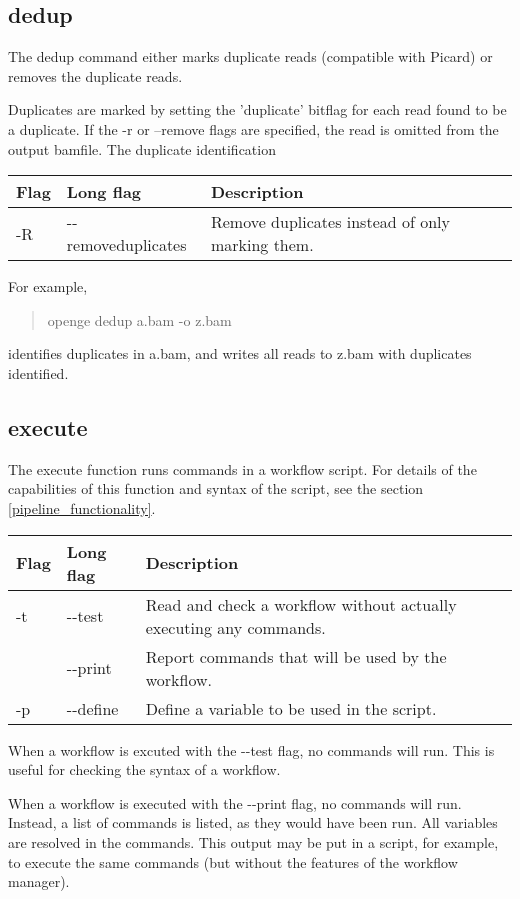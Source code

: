 \documentclass[11pt]{article}
\newcommand {\cmd}[1] {\begin{quote}#1\end{quote}}
\begin{document}
\subsection {dedup}
The dedup command either marks duplicate reads (compatible with Picard) or removes the duplicate reads. 

Duplicates are marked by setting the 'duplicate' bitflag for each read found to be a duplicate. If the -r or --remove flags are specified, the read is omitted from the output bamfile. The duplicate identification 

\begin{center}
\begin{tabular}{llp{3.5in}}
\hline
Flag&Long flag&Description\\ \hline
-R&{-}{-}removeduplicates&Remove duplicates instead of only marking them.\\
\end{tabular}
\end{center}

For example,
\cmd{openge dedup a.bam -o z.bam} 
identifies duplicates in a.bam, and writes all reads to z.bam with duplicates identified.

\subsection {execute}
\label{execute}

The execute function runs commands in a workflow script. For details of the capabilities of this function and syntax of the script, see the section \ref{pipeline_functionality}.

\begin{center}
\begin{tabular}{llp{4.5in}}
\hline
Flag&Long flag&Description\\ \hline
-t&{-}{-}test&Read and check a workflow without actually executing any commands.\\
&{-}{-}print&Report commands that will be used by the workflow.\\
-p&{-}{-}define&Define a variable to be used in the script.\\
\end{tabular}
\end{center}

When a workflow is excuted with the {-}{-}test flag, no commands will run. This is useful for checking the syntax of a workflow.

When a workflow is executed with the {-}{-}print flag, no commands will run. Instead, a list of commands is listed, as they would have been run. All variables are resolved in the commands. This output may be put in a script, for example, to execute the same commands (but without the features of the workflow manager).
\end{document}
